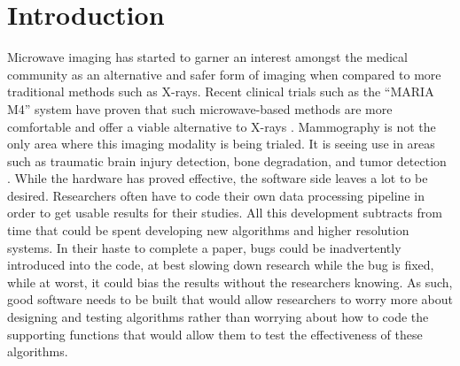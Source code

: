 \section*{Introduction}
Microwave imaging has started to garner an interest amongst the medical community as an alternative and safer form of imaging when compared to more traditional methods such as X-rays. Recent clinical trials such as the “MARIA M4” system have proven that such microwave-based methods are more comfortable and offer a viable alternative to X-rays \cite{RN1}. Mammography is not the only area where this imaging modality is being trialed. It is seeing use in areas such as traumatic brain injury detection, bone degradation, and tumor detection \cite{RN2}. While the hardware has proved effective, the software side leaves a lot to be desired. Researchers often have to code their own data processing pipeline in order to get usable results for their studies. All this development subtracts from time that could be spent developing new algorithms and higher resolution systems. In their haste to complete a paper, bugs could be inadvertently introduced into the code, at best slowing down research while the bug is fixed, while at worst, it could bias the results without the researchers knowing. As such, good software needs to be built that would allow researchers to worry more about designing and testing algorithms rather than worrying about how to code the supporting functions that would allow them to test the effectiveness of these algorithms.